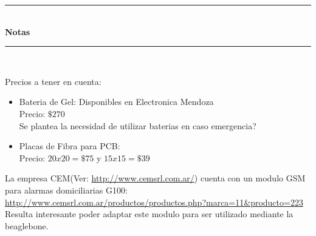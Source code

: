 \documentclass[idxtotoc,hyperref,openany]{labbook} %
\newcommand{\HRule}{\rule{\linewidth}{0.5mm}} %
\begin{document}
%
% 
% 
% 
% 
% 
% 
% 
% 
% 
% 
% 


\labday{} %
\begin{center}
\HRule \\[0.4cm]
{\huge \textbf{Notas}}\\[0.4cm] %
\HRule \\[1.5cm]
\end{center}

Precios a tener en cuenta:
\begin{itemize}
 \item Bateria de Gel: Disponibles en Electronica Mendoza\\
 Precio: $\$270$\\
 Se plantea la necesidad de utilizar baterias en caso emergencia?
 \item Placas de Fibra para PCB:\\
 Precio: $20x20=\$75$ y $15x15=\$39$
\end{itemize}

La empresa CEM(Ver: \url{http://www.cemsrl.com.ar/}) cuenta con un modulo GSM para 
alarmas domiciliarias G100: \url{http://www.cemsrl.com.ar/productos/productos.php?marca=11&producto=223}\\
Resulta interesante poder adaptar este modulo para ser utilizado mediante la beaglebone.



\end{document}
